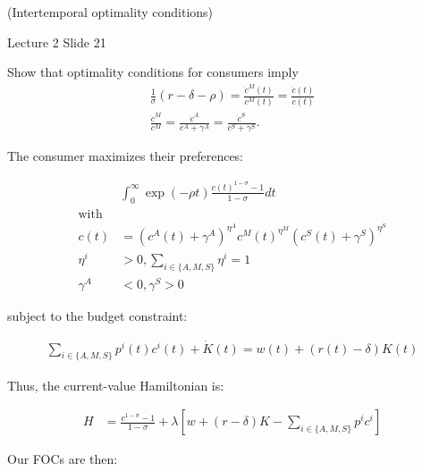 (Intertemporal optimality conditions)

Lecture 2 Slide 21

Show that optimality conditions for consumers imply
$$
\begin{gathered}
\frac{1}{\sigma}(r-\delta-\rho)=\frac{\dot{c}^M(t)}{c^M(t)}=\frac{\dot{c}(t)}{c(t)} \\
\frac{\dot{c}^M}{c^M}=\frac{\dot{c}^A}{c^A+\gamma^A}=\frac{\dot{c}^S}{c^S+\gamma^S} .
\end{gathered}
$$



The consumer maximizes their preferences:

\begin{align}
    &\int_0^{\infty} \exp (-\rho t) \frac{c(t)^{1-\sigma}-1}{1-\sigma} d t \\
    \text{with} \\
    c(t) & =\left(c^A(t)+\gamma^A\right)^{\eta^A} c^M(t)^{\eta^M}\left(c^S(t)+\gamma^S\right)^{\eta^S} \\
    \eta^i & >0, \sum_{i \in\{A, M, S\}} \eta^i=1 \\
    \gamma^A & <0, \gamma^S>0
\end{align}

subject to the budget constraint:

\begin{align}
    \sum_{i \in\{A, M, S\}} p^i(t) c^i(t)+\dot{K}(t)=w(t)+(r(t)-\delta) K(t)
\end{align}

Thus, the current-value Hamiltonian is:

\begin{align}
    H & = \frac{c^{1-\sigma}-1}{1-\sigma} + \lambda[w+(r-\delta) K -  \sum_{i \in\{A, M, S\}} p^i c^i]
\end{align}

Our FOCs are then:

